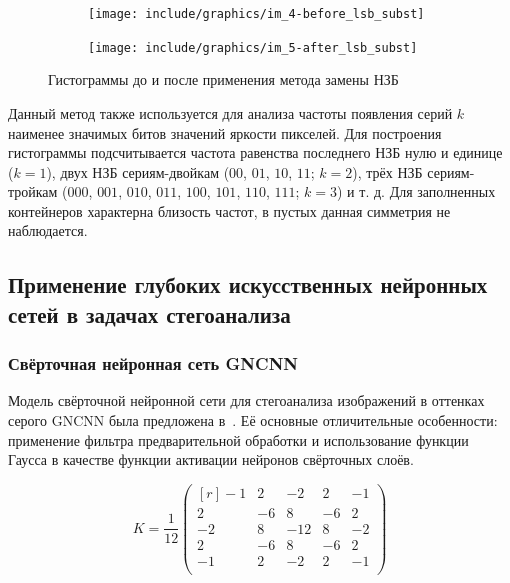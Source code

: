 \begin{figure}
     \centering
     \begin{subfigure}{\textwidth}
         \centering
         \texttt{[image: include/graphics/im\_4-before\_lsb\_subst]}
     \end{subfigure}
     \hfill
     \begin{subfigure}{\textwidth}
         \centering
         \texttt{[image: include/graphics/im\_5-after\_lsb\_subst]}
     \end{subfigure}
     \caption{Гистограммы до и после применения метода замены НЗБ}
     \label{fig:LSBHists}
\end{figure}

Данный метод также используется для анализа частоты появления серий $ k $ наименее значимых битов значений яркости пикселей. Для построения гистограммы подсчитывается частота равенства последнего НЗБ нулю и единице ($ k = 1 $), двух НЗБ сериям-двойкам ($ 00 $, $ 01 $, $ 10 $, $ 11 $; $ k = 2 $), трёх НЗБ сериям-тройкам ($ 000 $, $ 001 $, $ 010 $, $ 011 $, $ 100 $, $ 101 $, $ 110 $, $ 111 $; $ k = 3 $) и т. д. Для заполненных контейнеров характерна близость частот, в пустых данная симметрия не наблюдается.

\subsection{Применение глубоких искусственных нейронных сетей в задачах стегоанализа}
\subsubsection{Свёрточная нейронная сеть GNCNN}

Модель свёрточной нейронной сети для стегоанализа изображений в оттенках серого GNCNN была предложена в~\cite{GNCNN}. Её основные отличительные особенности: применение фильтра предварительной обработки и использование функции Гаусса в качестве функции активации нейронов свёрточных слоёв.

\begin{equation}
\label{eq:GNCNNConvKernel}
K = \frac{1}{12}
\begin{pmatrix*}[r]
    -1 &  2 &    -2 &  2 & -1 \\
     2 & -6 &     8 & -6 &  2 \\
    -2 &  8 & -12 &  8 & -2 \\
     2 & -6 &     8 & -6 &  2 \\
    -1 &  2 &    -2 &  2 & -1 \\
\end{pmatrix*}
\end{equation}

